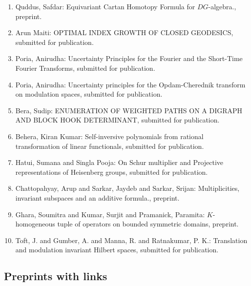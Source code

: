 \begin{enumerate}
\item Quddus, Safdar: Equivariant Cartan Homotopy Formula for $DG$-algebra., preprint.
\item Arun Maiti: OPTIMAL INDEX GROWTH OF CLOSED GEODESICS, submitted for publication.
\item Poria, Anirudha: Uncertainty Principles for the Fourier and the Short-Time Fourier Transforms, submitted for publication.
\item Poria, Anirudha: Uncertainty principles for the Opdam-Cherednik transform on modulation spaces, submitted for publication.
\item Bera, Sudip: ENUMERATION OF WEIGHTED PATHS ON A DIGRAPH AND BLOCK HOOK DETERMINANT, submitted for publication.
\item Behera, Kiran Kumar: Self-inversive polynomials from rational transformation of linear functionals, submitted for publication.
\item Hatui, Sumana and Singla Pooja: On Schur multiplier and Projective representations of Heisenberg groups, submitted for publication.
\item Chattopahyay, Arup and Sarkar, Jaydeb and Sarkar, Srijan: Multiplicities, invariant subspaces and an additive formula., preprint.
\item Ghara, Soumitra and Kumar, Surjit and Pramanick, Paramita: $K$-homogeneous tuple of operators on bounded symmetric domains, preprint.
\item Toft, J. and Gumber, A. and Manna, R. and Ratnakumar, P. K.: Translation and modulation invariant Hilbert spaces, submitted for publication.
\end{enumerate}


\subsection{Preprints with links}

